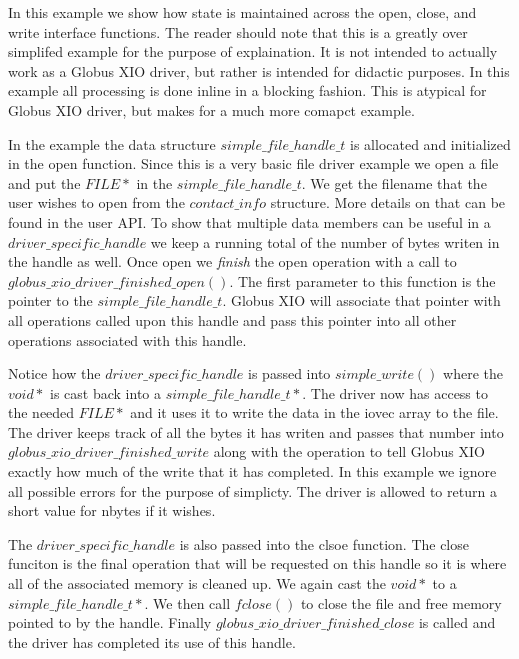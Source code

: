 \documentclass[11pt]{article}
\begin{document}
In this example we show how state is maintained across the open, close,
and write interface functions.  The reader should note that this is
a greatly over simplifed example for the purpose of explaination.  It is
not intended to actually work as a Globus XIO driver, but rather is intended
for didactic purposes.  In this example all processing is done inline in a
blocking fashion.  This is atypical for Globus XIO driver, but makes for
a much more comapct example.

In the example the data structure $simple\_file\_handle\_t$ is allocated
and initialized in the open function.  Since this is a very basic file
driver example we open a file and put the $FILE *$ in the 
$simple\_file\_handle\_t$.  We get the filename that the user wishes to
open from the $contact\_info$ structure.  More details on that can be found
in the user API.
To show that multiple data members can be useful in a
$driver\_specific\_handle$
we keep a running total of the number of bytes writen in the handle as well.
Once open we \emph{finish} the open operation with a call to
$globus\_xio\_driver\_finished\_open()$.  The first parameter to this function
is the pointer to the $simple\_file\_handle\_t$.  Globus XIO will associate
that pointer with all operations called upon this handle and pass this 
pointer into all other operations associated with this handle.

Notice how the $driver\_specific\_handle$ is passed into $simple\_write()$
where the $void *$ is cast back into a $simple\_file\_handle\_t *$.  The
driver now has access to the needed $FILE *$ and it uses it to write the 
data in the iovec array to the file.  The driver keeps track of all
the bytes it has writen and passes that number into 
$globus\_xio\_driver\_finished\_write$ along with the operation to 
tell Globus XIO exactly how much of the write that it has completed.  
In this example we ignore all possible errors for the purpose of simplicty.
The driver is allowed to return a short value for nbytes if it wishes.

The $driver\_specific\_handle$ is also passed into the clsoe function.
The close funciton is the final operation that will be requested on this 
handle so it is where all of the associated memory is cleaned up.  We
again cast the $void *$ to a $simple\_file\_handle\_t *$.  We then call 
$fclose()$ to close the file and free memory pointed to by the handle.
Finally $globus\_xio\_driver\_finished\_close$ is called and the driver has 
completed its use of this handle.
\end{document}
